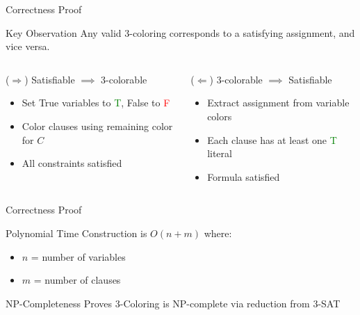 \documentclass{beamer}
\begin{document}
\begin{frame}{Correctness Proof}
    \begin{alertblock}{Key Observation}
    Any valid 3-coloring corresponds to a satisfying assignment, and vice versa.
    \end{alertblock}
    \begin{columns}[T]
        \begin{column}{0.5\textwidth}
            \begin{block}{($\Rightarrow$) Satisfiable $\implies$ 3-colorable}
        \       \begin{itemize}
                    \item Set True variables to \textcolor{green}{T}, False to \textcolor{red}{F}
                    \item Color clauses using remaining color for $C$
                    \item All constraints satisfied
                \end{itemize}
            \end{block}
        \end{column}
        \begin{column}{0.5\textwidth}
            \begin{block}{($\Leftarrow$) 3-colorable $\implies$ Satisfiable}
                \begin{itemize}
                    \item Extract assignment from variable colors
                    \item Each clause has at least one \textcolor{green}{T} literal
                    \item Formula satisfied
                \end{itemize}
            \end{block}
        \end{column}
    \end{columns}
\end{frame}

\begin{frame}{Correctness Proof}
    \begin{alertblock}{Polynomial Time}
        Construction is $O(n+m)$ where:
        \begin{itemize}
            \item $n$ = number of variables
            \item $m$ = number of clauses
        \end{itemize}
    \end{alertblock}

    \begin{exampleblock}{NP-Completeness}
        Proves 3-Coloring is NP-complete via reduction from 3-SAT
    \end{exampleblock}
\end{frame}
\end{document}

